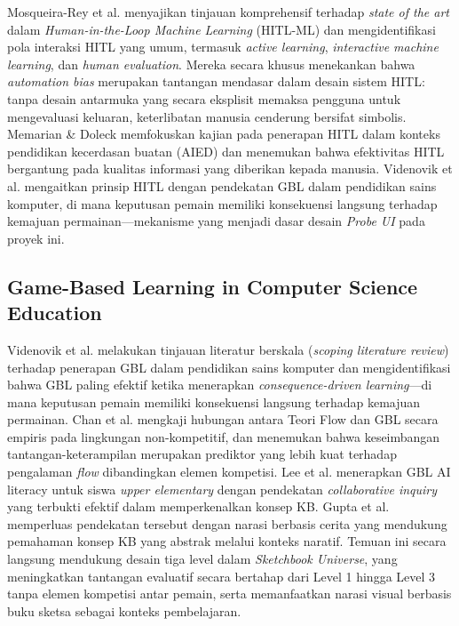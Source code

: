 \documentclass[12pt,a4paper,oneside,openany]{report}
\begin{document}
Mosqueira-Rey et al. \cite{ref4} menyajikan tinjauan komprehensif terhadap \textit{state of the art} dalam \textit{Human-in-the-Loop Machine Learning} (HITL-ML) dan mengidentifikasi pola interaksi HITL yang umum, termasuk \textit{active learning}, \textit{interactive machine learning}, dan \textit{human evaluation}. Mereka secara khusus menekankan bahwa \textit{automation bias} merupakan tantangan mendasar dalam desain sistem HITL: tanpa desain antarmuka yang secara eksplisit memaksa pengguna untuk mengevaluasi keluaran, keterlibatan manusia cenderung bersifat simbolis. Memarian \& Doleck \cite{ref5} memfokuskan kajian pada penerapan HITL dalam konteks pendidikan kecerdasan buatan (AIED) dan menemukan bahwa efektivitas HITL bergantung pada kualitas informasi yang diberikan kepada manusia. Videnovik et al. \cite{ref6} mengaitkan prinsip HITL dengan pendekatan GBL dalam pendidikan sains komputer, di mana keputusan pemain memiliki konsekuensi langsung terhadap kemajuan permainan---mekanisme yang menjadi dasar desain \textit{Probe UI} pada proyek ini.

\subsection{Game-Based Learning in Computer Science Education}
\label{subsec:penelitian-gbl-cs}

Videnovik et al. \cite{ref6} melakukan tinjauan literatur berskala (\textit{scoping literature review}) terhadap penerapan GBL dalam pendidikan sains komputer dan mengidentifikasi bahwa GBL paling efektif ketika menerapkan \textit{consequence-driven learning}---di mana keputusan pemain memiliki konsekuensi langsung terhadap kemajuan permainan. Chan et al. \cite{ref7} mengkaji hubungan antara Teori Flow dan GBL secara empiris pada lingkungan non-kompetitif, dan menemukan bahwa keseimbangan tantangan-keterampilan merupakan prediktor yang lebih kuat terhadap pengalaman \textit{flow} dibandingkan elemen kompetisi. Lee et al. \cite{ref13} menerapkan GBL AI literacy untuk siswa \textit{upper elementary} dengan pendekatan \textit{collaborative inquiry} yang terbukti efektif dalam memperkenalkan konsep KB. Gupta et al. \cite{ref14} memperluas pendekatan tersebut dengan narasi berbasis cerita yang mendukung pemahaman konsep KB yang abstrak melalui konteks naratif. Temuan ini secara langsung mendukung desain tiga level dalam \textit{Sketchbook Universe}, yang meningkatkan tantangan evaluatif secara bertahap dari Level 1 hingga Level 3 tanpa elemen kompetisi antar pemain, serta memanfaatkan narasi visual berbasis buku sketsa sebagai konteks pembelajaran.
\end{document}
